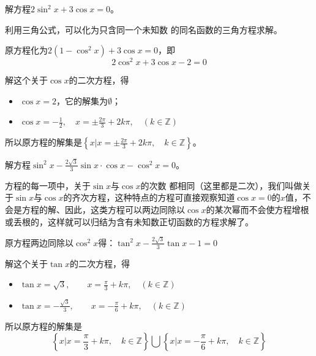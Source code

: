 \begin{example}
    解方程$2\sin^2x+3\cos x=0$。
\end{example}

\begin{analyze}
    利用三角公式，可以化为只含同一个未知数
的同名函数的三角方程求解。
\end{analyze}

\begin{solution}
    原方程化为$2(1-\cos^2x)+3\cos x=0$，即
\[2\cos^2x+3\cos x-2=0\]

解这个关于$\cos x$的二次方程，得
\begin{itemize}
    \item $\cos x=2$，它的解集为$\emptyset$；
    \item $\cos x=-\frac{1}{2},\quad x=\pm\frac{2\pi}{3}+2k\pi,\quad (k\in\mathbb{Z})$
\end{itemize}
所以原方程的解集是$\left\{x\Big|x=\pm \frac{2\pi}{3}+2k\pi,\quad k\in\mathbb{Z}\right\}$。
\end{solution}

\begin{example}
    解方程$\sin^2x-\frac{2\sqrt{3}}{3}\sin x\cdot \cos x-\cos^2x=0$。
\end{example}

\begin{analyze}
    方程的每一项中，关于$\sin x$与$\cos x$的次数
都相同（这里都是二次），我们叫做关于$\sin x$与$\cos x$的齐次方程，这种特点的方程可直接观察知道$\cos x=0$的$x$值，不会是方程的解、因此，这类方程可以两边同除以$\cos x$的某次幂而不会使方程增根或丢根的，这样就可以归结为含有未知数正切函数的方程求解了。
\end{analyze}

\begin{solution}
    原方程两边同除以$\cos^2x$得：$\tan^2x-\frac{2\sqrt{3}}{3}\tan x-1=0$

    解这个关于$\tan x$的二次方程，得
\begin{itemize}
    \item $\tan x=\sqrt{3},\qquad x=\frac{\pi}{3}+k\pi,\quad (k\in\mathbb{Z})$
    \item $\tan x=-\frac{\sqrt{3}}{3},\qquad x=-\frac{\pi}{6}+k\pi,\quad (k\in\mathbb{Z})$
\end{itemize}
所以原方程的解集是
\[\left\{x\Big|x=\frac{\pi}{3}+k\pi,\quad k\in\mathbb{Z} \right\}\bigcup \left\{x\Big| x=-\frac{\pi}{6}+k\pi,\quad k\in\mathbb{Z}\right\}\]

\end{solution}


